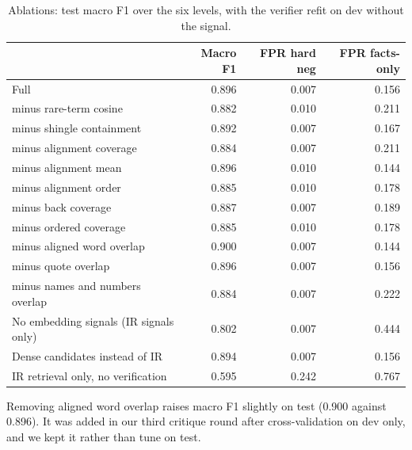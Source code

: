 \documentclass[11pt,a4paper]{article}
\newcommand{\hd}[1]{{\headfont\bfseries\footnotesize #1}}
\newcommand{\hrow}{\rowcolor{paper}}
\newcommand{\ours}{\rowcolor{ourrow}}
\begin{document}
\begin{table}[H]
  \centering\small
  \caption{Ablations: test macro F1 over the six levels, with the verifier refit on dev without the signal.}
  \label{tab:ablations}
  \begin{tabularx}{0.85\textwidth}{@{}l*{3}{R}@{}}
    \toprule
    \hrow \hd{Variant} & \hd{Macro F1} & \hd{FPR hard neg} & \hd{FPR facts-only} \\
    \midrule
    \ours Full & 0.896 & 0.007 & 0.156 \\
    minus rare-term cosine & 0.882 & 0.010 & 0.211 \\
    minus shingle containment & 0.892 & 0.007 & 0.167 \\
    minus alignment coverage & 0.884 & 0.007 & 0.211 \\
    minus alignment mean & 0.896 & 0.010 & 0.144 \\
    minus alignment order & 0.885 & 0.010 & 0.178 \\
    minus back coverage & 0.887 & 0.007 & 0.189 \\
    minus ordered coverage & 0.885 & 0.010 & 0.178 \\
    minus aligned word overlap & 0.900 & 0.007 & 0.144 \\
    minus quote overlap & 0.896 & 0.007 & 0.156 \\
    minus names and numbers overlap & 0.884 & 0.007 & 0.222 \\
    No embedding signals (IR signals only) & 0.802 & 0.007 & 0.444 \\
    Dense candidates instead of IR & 0.894 & 0.007 & 0.156 \\
    IR retrieval only, no verification & 0.595 & 0.242 & 0.767 \\
    \bottomrule
  \end{tabularx}
\end{table}

Removing aligned word overlap raises macro F1 slightly on test (0.900 against 0.896). It was added in our third critique round after cross-validation on dev only, and we kept it rather than tune on test.
\end{document}
